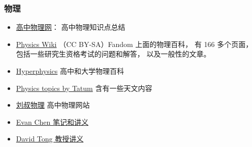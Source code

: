 \subsubsection{物理}
\begin{itemize}
\item \href{http://gaozhongwuli.com}{高中物理网}： 高中物理知识点总结
\item \href{http://www.example.com}{Physics Wiki} （CC BY-SA）Fandom 上面的物理百科， 有 166 多个页面， 包括一些研究生资格考试的问题和解答， 以及一般性的文章。
\item \href{http://hyperphysics.phy-astr.gsu.edu}{Hyperphysics} 高中和大学物理百科
\item \href{http://www.astro.uvic.ca/~tatum/index.php}{Physics topics by Tatum} 含有一些天文内容
\item \href{http://www.myliushu.com}{刘叔物理} 高中物理网站
\item \href{https://web.evanchen.cc/coursework.html}{Evan Chen 笔记和讲义}
\item \href{http://www.damtp.cam.ac.uk/user/tong/teaching.html}{David Tong 教授讲义}
\end{itemize}

